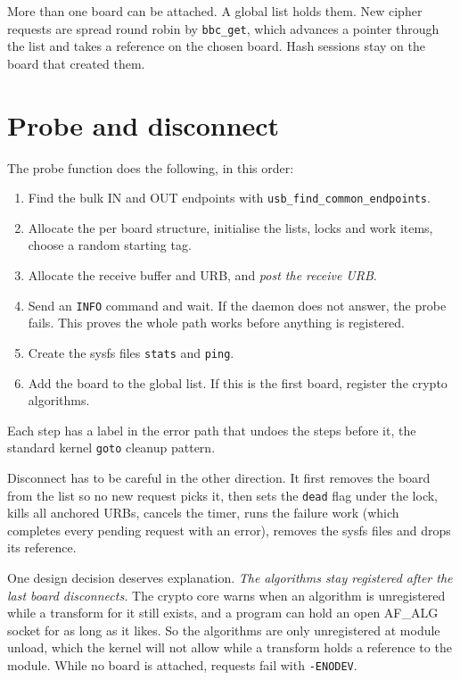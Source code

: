 \documentclass[11pt,a4paper,oneside]{report}
\newcommand{\code}[1]{\texttt{\small #1}}
\begin{document}
More than one board can be attached. A global list holds them. New cipher requests are spread round robin by \code{bbc\_get}, which advances a pointer through the list and takes a reference on the chosen board. Hash sessions stay on the board that created them.

\section{Probe and disconnect}\label{sec:probe}

The probe function does the following, in this order:

\begin{enumerate}
  \item Find the bulk IN and OUT endpoints with \code{usb\_find\_common\_endpoints}.
  \item Allocate the per board structure, initialise the lists, locks and work items, choose a random starting tag.
  \item Allocate the receive buffer and URB, and \emph{post the receive URB}.
  \item Send an \code{INFO} command and wait. If the daemon does not answer, the probe fails. This proves the whole path works before anything is registered.
  \item Create the sysfs files \code{stats} and \code{ping}.
  \item Add the board to the global list. If this is the first board, register the crypto algorithms.
\end{enumerate}

Each step has a label in the error path that undoes the steps before it, the standard kernel \code{goto} cleanup pattern.

Disconnect has to be careful in the other direction. It first removes the board from the list so no new request picks it, then sets the \code{dead} flag under the lock, kills all anchored URBs, cancels the timer, runs the failure work (which completes every pending request with an error), removes the sysfs files and drops its reference.

One design decision deserves explanation. \emph{The algorithms stay registered after the last board disconnects.} The crypto core warns when an algorithm is unregistered while a transform for it still exists, and a program can hold an open AF\_ALG socket for as long as it likes. So the algorithms are only unregistered at module unload, which the kernel will not allow while a transform holds a reference to the module. While no board is attached, requests fail with \code{-ENODEV}.
\end{document}
